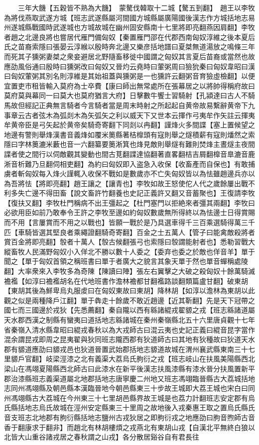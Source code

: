 　　三年大饑【五穀皆不熟為大饑】　蒙驁伐韓取十二城【驁五到翻】　趙王以李牧為將伐燕取武遂方城【班志武遂縣屬河間國方城縣屬廣陽國後漢志作方城括地志易州遂城縣戰國時武遂城也方城故城在幽州固安縣南十七里將即亮翻燕因肩翻】李牧者趙之北邊良將也嘗居代雁門備匈奴【秦置雁門邵在代郡西南匈奴淳維之後本夏后氏之苗裔索隱曰張晏云淳緱以殷時奔北邊又樂彦括地譜曰夏桀無道湯放之鳴條三年而死其子獯粥妻桀之衆妾避居北野隨畜移徙中國謂之匈奴其言夏后苗裔或當然也故應劭風俗通曰殷時曰獯粥改曰匈奴又晉灼云堯時曰葷粥周曰獫狁秦曰匈奴韋昭曰漢曰匈奴葷粥其別名則淳維是其始祖蓋與獯粥是一也獯許云翻粥音育獫虛檢翻】以便宜置吏市租皆輸入莫府為士卒費【康曰師出無常處所在張幕居之以將帥得稱府故曰莫府莫與幕同一曰莫大也莫府猶言大府】日擊數牛饗士習騎射【孔潁達曰古人不騎馬故但經記正典無言騎者今言騎者當是周末時射之所起起自黄帝故易繫辭黄帝下九事章云古者弦木為弧剡木為矢弧矢之利以威天下又世本云揮作弓夷牟作矢註云揮夷牟黄帝臣是弓矢起於黄帝矣騎奇寄翻下同剡以冉翻】謹烽火多間諜【塞上置候望之地邊有警則舉烽漢書音義烽如覆米䉛縣著桔橰頭有寇則舉之燧積薪有寇則燔然之索隱曰字林䉛漉米藪也音一六翻纂要䉛淅箕也烽見敵則舉燧有難則焚烽主晝燧主夜間諜者使之間行以伺敵觀其變動也間古莧翻諜達協翻著直畧翻桔吉屑翻橰音臯漉音鹿淅音析難乃旦翻伺相吏翻】為約曰匈奴即入盗急入收保【收畜產而自保也】有敢捕虜者斬匈奴每入烽火謹輒入收保不戰如是數歲亦不亡失匈奴皆以為怯雖趙邊兵亦以為吾將怯【將即亮翻】趙王讓之【讓青也】李牧如故王怒使佗人代之歲餘屢出戰不利多失亡邊不得田畜【說文畜許竹翻養也史記正義許又翻又音蓄聚也】王復請李牧【復扶又翻】李牧杜門稱病不出王彊起之【杜門塞門以拒絶來者彊其兩翻】李牧曰必欲用臣如前乃敢奉令王許之李牧至邊如約匈奴數歲無所得終以為怯邊士日得賞賜而不用【言屢賞而不用之以戰也】皆願一戰於是乃具選車得千三百乘選騎得萬三千匹【車騎皆選其堅良者乘繩證翻騎奇寄翻】百金之士五萬人【管子曰能禽敵殺將者賞百金將即亮翻】彀者十萬人【彀古候翻張弓也索隱曰彀謂能射者也】悉勒習戰大縱畜牧人民滿野匈奴小入佯北不勝以數十人委之【委弃也委之於敵也佯音羊】單于聞之【單于匈奴首領之稱班書曰單于者廣大之貌言其象天單于然也單音蟬稱處陵翻】大率衆來入李牧多為奇陳【陳讀曰陣】張左右翼擊之大破之殺匈奴十餘萬騎滅襜襤【如淳曰襜襤胡名在代地班書作澹林襜都甘翻襤路談翻類篇盧甘翻】破東胡【東胡其後為鮮卑烏丸服䖍曰在匈奴東故曰東胡】降林胡【如淳以澹林為東胡以此觀之似是兩種降戶江翻】單于犇走十餘歲不敢近趙邊【近其靳翻】先是天下冠帶之國七而三國邊於戎狄【先悉薦翻】秦自隴以西有緜諸緄戎翟䝠之戎【班志緜諸道屬天水郡西漢之制縣有蠻夷曰道括地志緜諸城在秦州秦嶺縣北五十六里唐貞觀十七年省秦嶺入清水縣韋昭曰緄戎春秋以為大戎師古曰混云夷也史記正義曰緄音昆字當作混余謂昆戎即周之昆夷翟與狄同班志隴西郡有狄道師古曰其地有狄種故曰狄道天水郡有䝠道應劭曰䝠戎邑也狄道晉置武始郡括地志䝠道故城在渭州襄武縣東南三十七里䝠戶官翻】岐梁涇漆之北有義渠大荔烏氏朐衍之戎【班志岐山在扶風美陽縣西北梁山在馮翊夏陽縣西北師古曰此漆水在新平後漢志扶風漆縣有漆水晉分扶風置新平郡治漆縣班志義渠道屬北地郡括地志唐寧慶二州地又班志馮翊臨晉縣古大荔城括地志同州馮翊縣及朝邑縣本漢臨晉地今朝邑縣東三十步故王城即大荔王城也宋白曰同州馮翊縣古大荔城在今州東三十七里胡邑縣界故王城是也荔力計翻班志安定郡有烏氏縣括地志烏氏故城在涇州安定縣東三十里周之故地後入戎秦惠王取之置烏氏縣氏音支班志北地郡有朐衍縣括地志鹽州古戎狄居之即朐衍戎之地應劭曰朐音煦師古音香于翻康求于翻非】而趙北有林胡樓煩之戎燕北有東胡山戎【自漢北平無終白狼以北皆大山重谷諸戎居之春秋謂之山戎】各分散居谿谷自有君長往